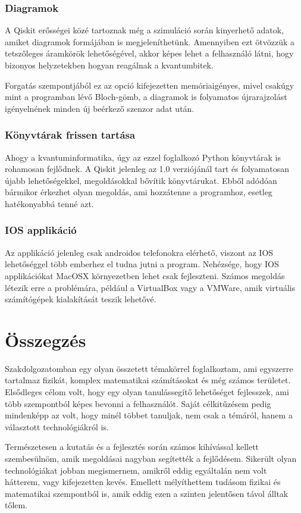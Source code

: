 \documentclass[
]{thesis-ekf}
\theoremstyle{definition}
\theoremstyle{remark}
\begin{document}
\subsection{Diagramok}
A Qiskit erősségei közé tartoznak még a szimuláció során kinyerhető adatok, amiket diagramok formájában is megjeleníthetünk. Amennyiben ezt ötvözzük a tetszőleges áramkörök lehetőségével, akkor képes lehet a felhasználó látni, hogy bizonyos helyzetekben hogyan reagálnak a kvantumbitek.

Forgatás szempontjából ez az opció kifejezetten memóriaigényes, mivel csakúgy mint a programban lévő Bloch-gömb, a diagramok is folyamatos újrarajzolást igényelnének minden új beérkező szenzor adat után.

\subsection{Könyvtárak frissen tartása}
Ahogy a kvantuminformatika, úgy az ezzel foglalkozó Python könyvtárak is rohamosan fejlődnek. A Qiskit jelenleg az 1.0 verziójánál tart és folyamatosan újabb lehetőségekkel, megoldásokkal bővítik könyvtárukat. Ebből adódóan bármikor érkezhet olyan megoldás, ami hozzátenne a programhoz, esetleg hatékonyabbá tenné azt.

\subsection{IOS applikáció}
Az applikáció jelenleg csak androidos telefonokra elérhető, viszont az IOS lehetőséggel több emberhez el tudna jutni a program. Nehézsége, hogy IOS applikációkat MacOSX környezetben lehet csak fejleszteni. Számos megoldás létezik erre a problémára, például a VirtualBox vagy a VMWare, amik virtuális számítógépek kialakítását teszik lehetővé.

\chapter*{Összegzés}
Szakdolgozatomban egy olyan összetett témakörrel foglalkoztam, ami egyszerre tartalmaz fizikát, komplex matematikai számításokat és még számos területet. Elsődleges célom volt, hogy egy olyan tanulássegítő lehetőséget fejlesszek, ami több szempontból képes bevonni a felhasználót. Saját célkitűzésem pedig mindenképp az volt, hogy minél többet tanuljak, nem csak a témáról, hanem a választott technológiákról is.

Természetesen a kutatás és a fejlesztés során számos kihívással kellett szembesülnöm, amik megoldásai nagyban segítették a fejlődésem. Sikerült olyan technológiákat jobban megismernem, amikről eddig egyáltalán nem volt hátterem, vagy kifejezetten kevés. Emellett mélyíthettem tudásom fizikai és matematikai szempontból is, amik eddig ezen a szinten jelentősen távol álltak tőlem.
\end{document}
